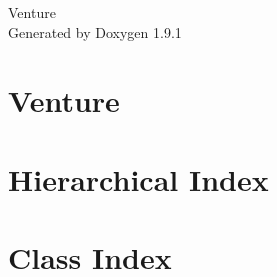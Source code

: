 \let\mypdfximage\pdfximage\def\pdfximage{\immediate\mypdfximage}\documentclass[twoside]{book}
\newcommand{\+}{\discretionary{\mbox{\scriptsize$\hookleftarrow$}}{}{}}
\newcommand{\clearemptydoublepage}{%
  \newpage{\pagestyle{empty}\cleardoublepage}%
}
\begin{document}
\raggedbottom

\hypersetup{pageanchor=false,
             bookmarksnumbered=true,
             pdfencoding=unicode
            }
\begin{titlepage}
\vspace*{7cm}
\begin{center}%
{\Large Venture }\\
\vspace*{1cm}
{\large Generated by Doxygen 1.9.1}\\
\end{center}
\end{titlepage}
\clearemptydoublepage
{}
\tableofcontents
\clearemptydoublepage
{}
\hypersetup{pageanchor=true}

\chapter{Venture}
\label{index}\hypertarget{index}{}
\chapter{Hierarchical Index}

\chapter{Class Index}

\end{document}
